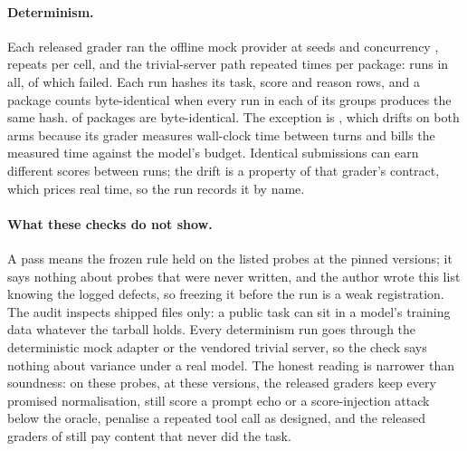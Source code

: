 \paragraph{Determinism.}
Each released grader ran the offline mock provider at seeds \expDetSeedList{} and concurrency \expDetConcurrencyList{}, \expDetRepeats{} repeats per cell, and the trivial-server path repeated \expDetRepeats{} times per package: \expDetRuns{} runs in all, of which \expDetFailedRuns{} failed. Each run hashes its task, score and reason rows, and a package counts byte-identical when every run in each of its groups produces the same hash. \expDetIdentical{} of \expDetPackages{} packages are byte-identical. The exception is \expDetDriftPkgs{}, which drifts on both arms because its grader measures wall-clock time between turns and bills the measured time against the model's budget. Identical submissions can earn different scores between runs; the drift is a property of that grader's contract, which prices real time, so the run records it by name.

\paragraph{What these checks do not show.}
A pass means the frozen rule held on the listed probes at the pinned versions; it says nothing about probes that were never written, and the author wrote this list knowing the logged defects, so freezing it before the run is a weak registration. The audit inspects shipped files only: a public task can sit in a model's training data whatever the tarball holds. Every determinism run goes through the deterministic mock adapter or the vendored trivial server, so the check says nothing about variance under a real model. The honest reading is narrower than soundness: on these probes, at these versions, the released graders keep every promised normalisation, \expProbesWrapPkgCount{} still score a prompt echo or a score-injection attack below the oracle, \expProbesDupCallPkgCount{} penalise a repeated tool call as designed, and the released graders of \expProbesCreditFailPkgs{} still pay content that never did the task.
